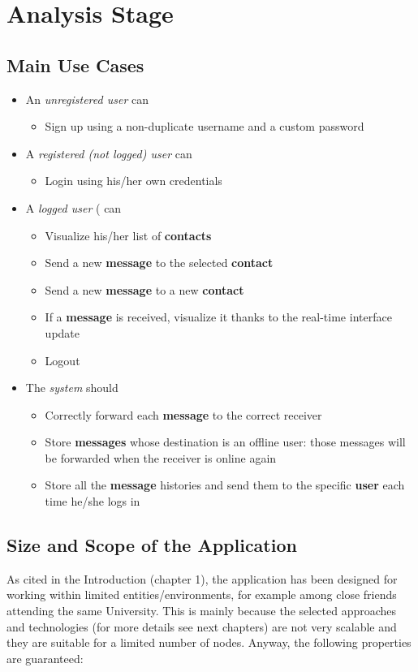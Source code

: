 \section{Analysis Stage}
\subsection{Main Use Cases}
\begin{itemize}
	\item An \textit{unregistered user} can
	\begin{itemize}
		\item Sign up using a non-duplicate username and a custom password
	\end{itemize}
	\item A \textit{registered (not logged) user} can
	\begin{itemize}
		\item Login using his/her own credentials
	\end{itemize}
	
	\item A \textit{logged user} ( can
	\begin{itemize}
		\item Visualize his/her list of \textbf{contacts}
		\item Send a new \textbf{message} to the selected \textbf{contact}
		\item Send a new \textbf{message}  to a new \textbf{contact}
		\item If a \textbf{message}  is received, visualize it thanks to the real-time interface update
		\item Logout
\end{itemize}
	\item The \textit{system} should
	\begin{itemize}
		\item Correctly forward each \textbf{message} to the correct receiver
		\item Store \textbf{messages} whose destination is an offline user: those messages will be forwarded when the receiver is online again
		\item Store all the \textbf{message} histories and send them to the specific \textbf{user} each time he/she logs in
	\end{itemize}
\end{itemize}

\subsection{Size and Scope of the Application}
As cited in the Introduction (chapter 1), the application has been designed for working within limited entities/environments, for example among close friends attending the same University. 
This is mainly because the selected approaches and technologies (for more details see next chapters) are not very scalable and they are suitable for a limited number of nodes.
Anyway, the following properties are guaranteed:



